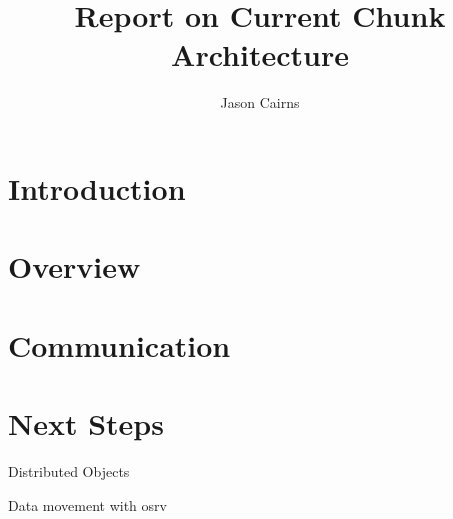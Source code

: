 \documentclass[a4paper,10pt]{article}
\begin{document}
\title{Report on Current Chunk Architecture}
\author{Jason Cairns}
  
\maketitle

\section{Introduction}

\section{Overview}

\section{Communication}

\section{Next Steps}

Distributed Objects

Data movement with osrv
\end{document}
